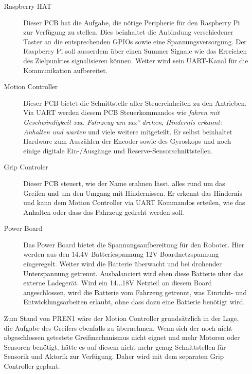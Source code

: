 \documentclass[main.tex]{subfiles} %
\begin{document}
\begin{description}
      \item[Raspberry HAT] Dieser PCB hat die Aufgabe, die nötige Peripherie für den
            Raspberry Pi zur Verfügung zu stellen. Dies beinhaltet die Anbindung
            verschiedener Taster an die entsprechenden GPIOs sowie eine
            Spannungsversorgung. Der Raspberry Pi soll ausserdem über einen Summer Signale
            wie das Erreichen des Zielpunktes signalisieren können. Weiter wird sein
            UART-Kanal für die Kommunikation aufbereitet.
      \item[Motion Controller] Dieser PCB bietet die Schnittstelle aller Steuereinheiten zu
            den Antrieben. Via UART werden diesem PCB Steuerkommandos wie \textit{fahren
                  mit Geschwindigkeit xxx}, \textit{Fahrzeug um xxx° drehen}, \textit{Hindernis
                  erkannt: Anhalten und warten} und viele weitere mitgeteilt. Er selbst
            beinhaltet Hardware zum Auszählen der Encoder sowie des Gyroskops und noch
            einige digitale Ein-/Ausgänge und Reserve-Sensorschnittstellen.
      \item[Grip Controler] Dieser PCB steuert, wie der Name erahnen lässt, alles rund um
            das Greifen und um den Umgang mit Hindernissen. Er erkennt das Hindernis und
            kann dem Motion Controller via UART Kommandos erteilen, wie das Anhalten oder
            dass das Fahrzeug gedreht werden soll.
      \item[Power Board] Das Power Board bietet die Spannungsaufbereitung für den Roboter.
            Hier werden aus den 14.4V Batteriespannung 12V Boardnetzspannung eingeregelt.
            Weiter wird die Batterie überwacht und bei drohender Unterspannung getrennt.
            Ausbalanciert wird eben diese Batterie über das externe Ladegerät. Wird ein
            14...18V Netzteil an diesem Board angeschlossen, wird die Batterie vom Fahrzeug
            getrennt, was Einricht- und Entwicklungsarbeiten erlaubt, ohne dass dazu eine
            Batterie benötigt wird.
\end{description}

Zum Stand von PREN1 wäre der Motion Controller grundsätzlich in der Lage, die
Aufgabe des Greifers ebenfalls zu übernehmen. Wenn sich der noch nicht
abgeschlossen getestete Greifmechanismus nicht eignet und mehr Motoren oder
Sensoren benötigt, hätte es auf diesem nicht mehr genug Schnittstellen für
Sensorik und Aktorik zur Verfügung. Daher wird mit dem separaten Grip
Controller geplant.
\end{document}
